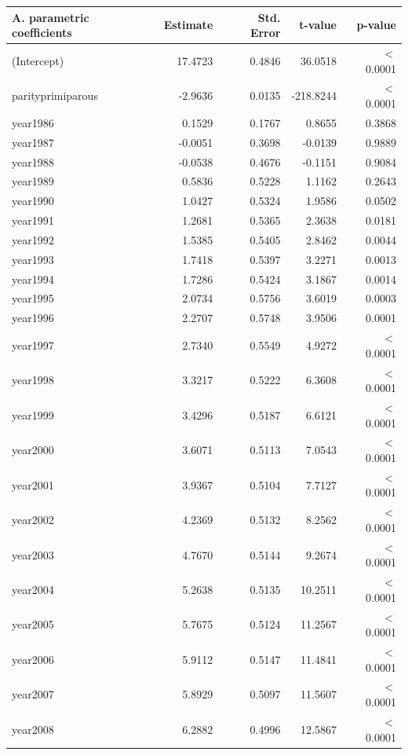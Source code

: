     \begin{table}[H]
    \centering
    \begin{tabular}{lrrrr}
    \textbf{A. parametric coefficients} & Estimate & Std. Error & t-value & p-value \\ 
       \hline
       \hline
  (Intercept) & 17.4723 & 0.4846 & 36.0518 & $<$ 0.0001 \\ 
  parityprimiparous & -2.9636 & 0.0135 & -218.8244 & $<$ 0.0001 \\ 
  year1986 & 0.1529 & 0.1767 & 0.8655 & 0.3868 \\ 
  year1987 & -0.0051 & 0.3698 & -0.0139 & 0.9889 \\ 
  year1988 & -0.0538 & 0.4676 & -0.1151 & 0.9084 \\ 
  year1989 & 0.5836 & 0.5228 & 1.1162 & 0.2643 \\ 
  year1990 & 1.0427 & 0.5324 & 1.9586 & 0.0502 \\ 
  year1991 & 1.2681 & 0.5365 & 2.3638 & 0.0181 \\ 
  year1992 & 1.5385 & 0.5405 & 2.8462 & 0.0044 \\ 
  year1993 & 1.7418 & 0.5397 & 3.2271 & 0.0013 \\ 
  year1994 & 1.7286 & 0.5424 & 3.1867 & 0.0014 \\ 
  year1995 & 2.0734 & 0.5756 & 3.6019 & 0.0003 \\ 
  year1996 & 2.2707 & 0.5748 & 3.9506 & 0.0001 \\ 
  year1997 & 2.7340 & 0.5549 & 4.9272 & $<$ 0.0001 \\ 
  year1998 & 3.3217 & 0.5222 & 6.3608 & $<$ 0.0001 \\ 
  year1999 & 3.4296 & 0.5187 & 6.6121 & $<$ 0.0001 \\ 
  year2000 & 3.6071 & 0.5113 & 7.0543 & $<$ 0.0001 \\ 
  year2001 & 3.9367 & 0.5104 & 7.7127 & $<$ 0.0001 \\ 
  year2002 & 4.2369 & 0.5132 & 8.2562 & $<$ 0.0001 \\ 
  year2003 & 4.7670 & 0.5144 & 9.2674 & $<$ 0.0001 \\ 
  year2004 & 5.2638 & 0.5135 & 10.2511 & $<$ 0.0001 \\ 
  year2005 & 5.7675 & 0.5124 & 11.2567 & $<$ 0.0001 \\ 
  year2006 & 5.9112 & 0.5147 & 11.4841 & $<$ 0.0001 \\ 
  year2007 & 5.8929 & 0.5097 & 11.5607 & $<$ 0.0001 \\ 
  year2008 & 6.2882 & 0.4996 & 12.5867 & $<$ 0.0001 \\ 

\end{tabular}
\end{table}

